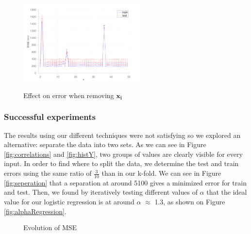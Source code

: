 \documentclass{article} %
\begin{document}
\begin{figure}[!h]
\center

\includegraphics[width=2.5in]{figures/dimRed.pdf} 
\label{fig:dimRed}

\caption{Effect on error when removing  $\mathbf{x_{i}}$}
\end{figure}


\subsubsection{Successful experiments}

The results using our different techniques were not satisfying so we explored an alternative: separate the data into two sets. As we can see in Figure \ref{fig:correlations} and \ref{fig:histY}, two groups of values are clearly visible for every input. In order to find where to split the data, we determine the test and train errors using the same ratio of $\frac{3}{10}$ than in our k-fold. We can see in Figure \ref{fig:seperation} that a separation at around 5100 gives a minimized error for train and test. Then, we found by iteratively testing different values of $\alpha$ that the ideal value for our logistic regression is at around $\alpha$ $\approx$ 1.3, as shown on Figure \ref{fig:alphaRegression}.

\begin{figure}[!h]
\center

\hfill
{}
\caption{Evolution of MSE}
\end{figure}
\end{document}
